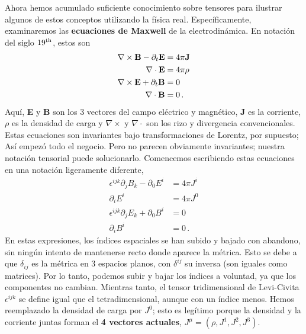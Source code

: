 \documentclass[11pt,b5paper,openany,twoside]{book}
\newcommand{\p}[1]{{\partial_{#1}}}
\begin{document}
Ahora hemos acumulado suficiente conocimiento sobre tensores para ilustrar algunos de estos conceptos utilizando la física real.
Específicamente, examinaremos las {\bf ecuaciones de Maxwell} de la electrodinámica.
En notación del siglo $19^{\rm th}$, estos son
\begin{align}
\nabla\times{\bf B} - \p{t}{\bf E} &= 4\pi{\bf J}\nonumber \\
\nabla\cdot{\bf E} &= 4\pi\rho\nonumber \\
\nabla\times{\bf E} + \p{t}{\bf B} &= 0\nonumber \\
\nabla\cdot{\bf B} &= 0\,. \label{1.73}
\end{align}
Aquí, {\bf E} y {\bf B} son los 3 vectores del campo eléctrico y magnético, {\bf J} es la corriente, $\rho$ es la densidad de carga y $\nabla\times$ y $\nabla\cdot$ son los rizo y divergencia convencionales.
Estas ecuaciones son invariantes bajo transformaciones de Lorentz, por supuesto; Así empezó todo el negocio.
Pero no parecen obviamente invariantes; nuestra notación tensorial puede solucionarlo.
Comencemos escribiendo estas ecuaciones en una notación ligeramente diferente,
\begin{align}
\epsilon^{ijk}\p{j}B_k - \p0 E^i &=
4\pi J^i\nonumber \\
\p{i}E^i &= 4\pi J^0\nonumber \\
\epsilon^{ijk}\p{j}E_k + \p0 B^i &= 0\nonumber \\
\p{i}B^i &= 0\,. \label{1.74}
\end{align}
En estas expresiones, los índices espaciales se han subido y bajado con abandono, sin ningún intento de mantenerse recto donde aparece la métrica.
Esto se debe a que $\delta_{ij}$ es la métrica en 3 espacios planos, con $\delta^{ij}$ su inversa (son iguales como matrices).
Por lo tanto, podemos subir y bajar los índices a voluntad, ya que los componentes no cambian.
Mientras tanto, el tensor tridimensional de Levi-Civita $\epsilon^{ijk}$ se define igual que el tetradimensional, aunque con un índice menos.
Hemos reemplazado la densidad de carga por $J^0$; esto es legítimo porque la densidad y la corriente juntas forman el {\bf 4 vectores actuales}, $J^\mu = (\rho,J^1,J^2,J^3)$.
\end{document}
